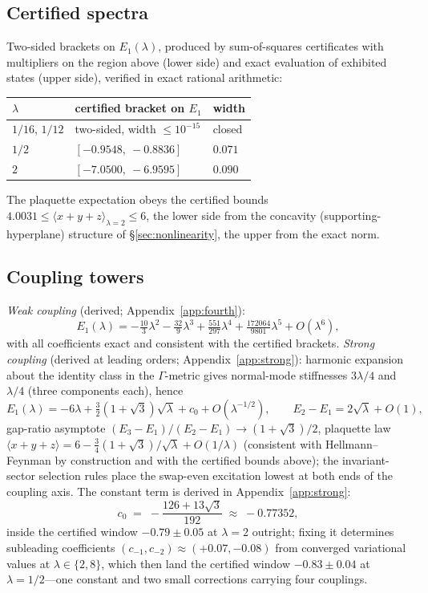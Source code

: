 \documentclass[11pt]{article}
\theoremstyle{definition}
\theoremstyle{remark}
\begin{document}
\subsection{Certified spectra}
Two-sided brackets on $E_1(\lambda)$, produced by sum-of-squares
certificates with multipliers on the region above (lower side) and exact
evaluation of exhibited states (upper side), verified in exact rational
arithmetic:

\begin{center}
\begin{tabular}{lll}
\toprule
$\lambda$ & certified bracket on $E_1$ & width \\
\midrule
$1/16$, $1/12$ & two-sided, width $\le 10^{-15}$ & closed \\
$1/2$ & $[-0.9548,\ -0.8836]$ & $0.071$ \\
$2$ & $[-7.0500,\ -6.9595]$ & $0.090$ \\
\bottomrule
\end{tabular}
\end{center}

\noindent The plaquette expectation obeys the certified bounds
$4.0031 \le \langle x{+}y{+}z\rangle_{\lambda=2} \le 6$, the lower side
from the concavity (supporting-hyperplane) structure of
\S\ref{sec:nonlinearity}, the upper from the exact norm.

\subsection{Coupling towers}
\emph{Weak coupling} (derived; Appendix~\ref{app:fourth}):
\[
E_1(\lambda) = -\tfrac{10}{3}\lambda^2
- \tfrac{32}{9}\lambda^3 + \tfrac{551}{297}\lambda^4
+ \tfrac{172064}{9801}\lambda^5 + O(\lambda^6),
\]
with all coefficients exact and consistent with the certified
brackets.  \emph{Strong coupling}
(derived at leading orders; Appendix~\ref{app:strong}): harmonic
expansion about the identity class in the $\Gamma$-metric gives
normal-mode stiffnesses $3\lambda/4$ and $\lambda/4$ (three components
each), hence
\[
E_1(\lambda) = -6\lambda + \tfrac32(1{+}\sqrt3)\sqrt\lambda + c_0 +
O(\lambda^{-1/2}),
\qquad
E_2 - E_1 = 2\sqrt\lambda + O(1),
\]
gap-ratio asymptote $(E_3 - E_1)/(E_2 - E_1) \to (1+\sqrt3)/2$, plaquette
law $\langle x{+}y{+}z\rangle = 6 - \tfrac34(1{+}\sqrt3)/\sqrt\lambda +
O(1/\lambda)$ (consistent with Hellmann--Feynman by construction and with
the certified bounds above); the invariant-sector selection rules place
the swap-even excitation lowest at both ends of the coupling axis.  The
constant term is derived in Appendix~\ref{app:strong}:
\[
c_0 \;=\; -\frac{126 + 13\sqrt3}{192} \;\approx\; -0.77352,
\]
inside the certified window $-0.79 \pm 0.05$ at $\lambda = 2$
outright; fixing it determines subleading coefficients
$(c_{-1}, c_{-2}) \approx (+0.07, -0.08)$ from converged variational
values at $\lambda \in \{2, 8\}$, which then land the certified window
$-0.83 \pm 0.04$ at $\lambda = 1/2$---one constant and two small
corrections carrying four couplings.
\end{document}
